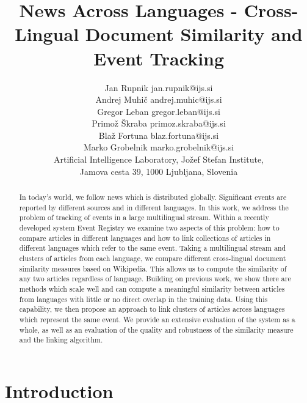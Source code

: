 \documentclass[twoside,11pt]{article}
\begin{document}
\title{News Across Languages -
Cross-Lingual Document Similarity and Event Tracking}

\author{\name Jan Rupnik \email jan.rupnik@ijs.si \\
       \name Andrej Muhi\v{c} \email andrej.muhic@ijs.si \\
       \name Gregor Leban \email gregor.leban@ijs.si \\
       \name Primo\v{z} \v{S}kraba \email primoz.skraba@ijs.si \\
       \name Bla\v{z} Fortuna \email blaz.fortuna@ijs.si \\
       \name Marko Grobelnik \email marko.grobelnik@ijs.si \\
       \addr Artificial Intelligence Laboratory, Jo\v{z}ef Stefan Institute,\\
       Jamova cesta 39, 1000 Ljubljana, Slovenia}

\maketitle

\begin{abstract}

In today's world, we follow news which is distributed globally. Significant events are reported by different sources and in different languages. In this work, we address the problem of tracking of events in a large multilingual stream. Within a recently developed system Event Registry we examine two aspects of this problem: how to compare articles in different languages and how to link collections of articles in different languages which refer to the same event.  Taking a multilingual stream and clusters of articles from each language, we compare different cross-lingual document similarity measures based on Wikipedia. This allows us to compute the similarity of any two articles regardless of language. Building on previous work, we show there are methods which scale well and can compute a meaningful similarity between articles from languages with little or no direct overlap in the training data.
Using this capability, we then propose an approach to link clusters of articles across languages which represent the same event. We provide an extensive evaluation of the system as a whole, as well as an evaluation of the quality and robustness of the similarity measure and the linking algorithm.
\end{abstract}

\section{Introduction}
\end{document}
